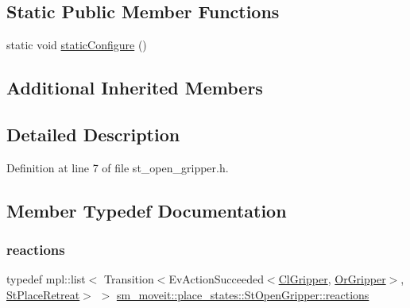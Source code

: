 \subsection*{Static Public Member Functions}
\begin{DoxyCompactItemize}
\item 
static void \hyperlink{structsm__moveit_1_1place__states_1_1StOpenGripper_a3a7ab2224ad0ca4c1e88d8432b0f37bf}{static\+Configure} ()
\end{DoxyCompactItemize}
\subsection*{Additional Inherited Members}


\subsection{Detailed Description}


Definition at line 7 of file st\+\_\+open\+\_\+gripper.\+h.



\subsection{Member Typedef Documentation}
\mbox{\label{structsm__moveit_1_1place__states_1_1StOpenGripper_ac79e4ee839e3fa0aaf17e97a146034a9}} 
\subsubsection{\texorpdfstring{reactions}{reactions}}
{\footnotesize\ttfamily typedef mpl\+::list$<$ Transition$<$Ev\+Action\+Succeeded$<$\hyperlink{classsm__moveit_1_1cl__gripper_1_1ClGripper}{Cl\+Gripper}, \hyperlink{classsm__moveit_1_1OrGripper}{Or\+Gripper}$>$, \hyperlink{structsm__moveit_1_1place__states_1_1StPlaceRetreat}{St\+Place\+Retreat}$>$ $>$ \hyperlink{structsm__moveit_1_1place__states_1_1StOpenGripper_ac79e4ee839e3fa0aaf17e97a146034a9}{sm\+\_\+moveit\+::place\+\_\+states\+::\+St\+Open\+Gripper\+::reactions}}



